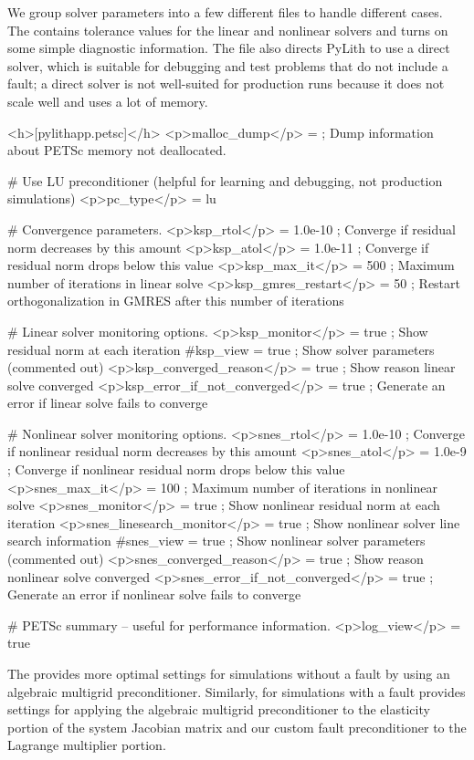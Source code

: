 We group solver parameters into a few different files to handle
different cases. The  contains tolerance
values for the linear and nonlinear solvers and turns on some simple
diagnostic information. The file also directs PyLith to use a direct
solver, which is suitable for debugging and test problems that do not
include a fault; a direct solver is not well-suited for production
runs because it does not scale well and uses a lot of memory.
\begin{cfg}
<h>[pylithapp.petsc]</h>
<p>malloc_dump</p> = ; Dump information about PETSc memory not deallocated.

# Use LU preconditioner (helpful for learning and debugging, not production simulations)
<p>pc_type</p> = lu

# Convergence parameters.
<p>ksp_rtol</p> = 1.0e-10 ; Converge if residual norm decreases by this amount
<p>ksp_atol</p> = 1.0e-11 ; Converge if residual norm drops below this value
<p>ksp_max_it</p> = 500 ; Maximum number of iterations in linear solve
<p>ksp_gmres_restart</p> = 50 ; Restart orthogonalization in GMRES after this number of iterations

# Linear solver monitoring options.
<p>ksp_monitor</p> = true ; Show residual norm at each iteration
#ksp_view = true ; Show solver parameters (commented out)
<p>ksp_converged_reason</p> = true ; Show reason linear solve converged
<p>ksp_error_if_not_converged</p> = true ; Generate an error if linear solve fails to converge

# Nonlinear solver monitoring options.
<p>snes_rtol</p> = 1.0e-10 ; Converge if nonlinear residual norm decreases by this amount
<p>snes_atol</p> = 1.0e-9 ; Converge if nonlinear residual norm drops below this value
<p>snes_max_it</p> = 100 ; Maximum number of iterations in nonlinear solve
<p>snes_monitor</p> = true ; Show nonlinear residual norm at each iteration
<p>snes_linesearch_monitor</p> = true ; Show nonlinear solver line search information
#snes_view = true ; Show nonlinear solver parameters (commented out)
<p>snes_converged_reason</p> = true ; Show reason nonlinear solve converged
<p>snes_error_if_not_converged</p> = true ; Generate an error if nonlinear solve fails to converge

# PETSc summary -- useful for performance information.
<p>log_view</p> = true
\end{cfg}

The
 provides more optimal
settings for simulations without a fault by using an algebraic
multigrid preconditioner. Similarly, for simulations with a fault
 provides settings for applying the
algebraic multigrid preconditioner to the elasticity portion of the
system Jacobian matrix and our custom fault preconditioner to the
Lagrange multiplier portion.

